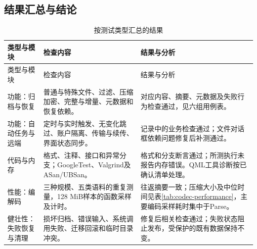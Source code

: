 \subsection{结果汇总与结论}
\begin{longtable}{L{.21\linewidth}L{.39\linewidth}L{.31\linewidth}}
\caption{按测试类型汇总的结果}\label{tab:test-result-analysis}\\\toprule 类型与模块 & 检查内容 & 结果与分析\\\midrule\endfirsthead
\toprule 类型与模块 & 检查内容 & 结果与分析\\\midrule\endhead
\bottomrule\endfoot
功能：归档与恢复 & 普通与特殊文件、过滤、压缩加密、完整与增量、元数据和恢复依赖。 & 对应内容、摘要、元数据及失败行为检查通过，见六组用例表。\\
功能：自动任务与远端 & 定时与实时触发、无变化跳过、账户隔离、传输与续传、界面状态同步。 & 记录中的业务检查通过；文件对话框依赖问题修复后补测通过。\\
代码与内存 & 格式、注释、接口和异常分支；GoogleTest、Valgrind及ASan/UBSan。 & 格式和分支断言通过；所测执行未报告内存错误。QML工具诊断按已确认清单处理。\\
性能：编解码 & 三种规模、五类语料的重复测量，128 MiB样本的函数采样及计时。 & 往返摘要一致；压缩大小及中位时间见表\ref{tab:codec-performance}，主要编码采样耗时集中于Parse。\\
健壮性：失败恢复与清理 & 损坏归档、错误输入、系统调用失败、迁移回滚和临时目录冲突。 & 修复后相关检查通过；失败状态阻止发布，受保护的既有数据保持不变。\\
\end{longtable}
